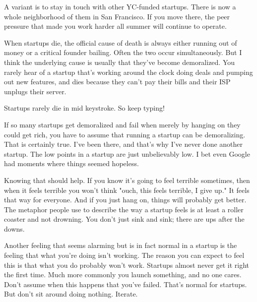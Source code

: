 A variant is to stay in touch
                    with other YC-funded startups. There is now a whole
                    neighborhood of them in San Francisco. If you move there,
                    the peer pressure that made you work harder all summer will
                    continue to operate.

When startups die, the
                    official cause of death is always either running out of
                    money or a critical founder bailing. Often the two occur
                    simultaneously. But I think the underlying cause is usually
                    that they've become demoralized. You rarely hear of a
                    startup that's working around the clock doing deals and
                    pumping out new features, and dies because they can't pay
                    their bills and their ISP unplugs their server.

Startups
                    rarely die in mid keystroke. So keep typing!

If
                    so many startups get demoralized and fail when merely by
                    hanging on they could get rich, you have to assume that
                    running a startup can be demoralizing. That is certainly
                    true. I've been there, and that's why I've never done
                    another startup. The low points in a startup are just
                    unbelievably low. I bet even Google had moments where things
                    seemed hopeless.

Knowing that should help. If you
                    know it's going to feel terrible sometimes, then when it
                    feels terrible you won't think "ouch, this feels terrible, I
                    give up." It feels that way for everyone. And if you just
                    hang on, things will probably get better. The metaphor
                    people use to describe the way a startup feels is at least a
                    roller coaster and not drowning. You don't just sink and
                    sink; there are ups after the downs.

Another
                    feeling that seems alarming but is in fact normal in a
                    startup is the feeling that what you're doing isn't working.
                    The reason you can expect to feel this is that what you do
                    probably won't work. Startups almost never get it right the
                    first time. Much more commonly you launch something, and no
                    one cares. Don't assume when this happens that you've
                    failed. That's normal for startups. But don't sit around
                    doing nothing. Iterate.

